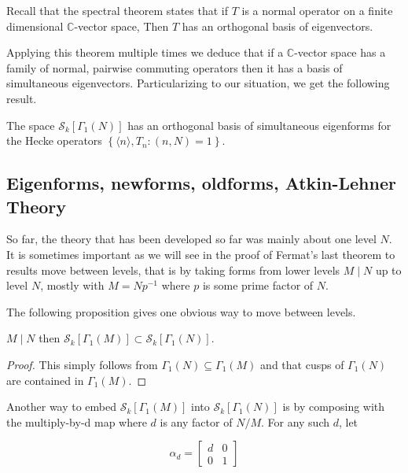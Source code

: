 Recall that the spectral theorem states that if $T$ is a normal operator on a finite dimensional $\mathbb{C}$-vector space, Then $T$ has an orthogonal basis of eigenvectors.

Applying this theorem multiple times we deduce that if a $\mathbb{C}$-vector space has a family of normal, pairwise commuting operators then it has a basis of simultaneous eigenvectors. Particularizing to our situation, we get the following result.
\begin{theorem}
    The space $\mathcal{S}_{k}\left[\Gamma_{1}(N)\right]$ has an orthogonal basis of simultaneous eigenforms for the Hecke operators $\left\{\langle n\rangle, T_{n}:(n, N)=1\right\}$.

\end{theorem}

\subsection{Eigenforms, newforms, oldforms, Atkin-Lehner Theory}

So far, the theory that has been developed so far was mainly about one level $N$. It is sometimes important as we will see in the proof of Fermat's last theorem to results move between levels, that is by taking forms from lower levels $M \mid N$ up to level $N$, mostly with $M=N p^{-1}$ where $p$ is some prime factor of $N$.

The following proposition gives one obvious way to move between levels.

\begin{proposition}
    $M \mid N$ then $\mathcal{S}_{k}\left[\Gamma_{1}(M)\right] \subset \mathcal{S}_{k}\left[\Gamma_{1}(N)\right]$.
    \begin{proof}
        This simply follows from $\Gamma_1(N) \subseteq \Gamma_1(M)$ and that cusps of $\Gamma_1(N)$ are contained in $\Gamma_1(M).$ 
    \end{proof}
\end{proposition}

Another way to embed $\mathcal{S}_{k}\left[\Gamma_{1}(M)\right]$ into $\mathcal{S}_{k}\left[\Gamma_{1}(N)\right]$ is by composing with the multiply-by-d map where $d$ is any factor of $N / M$. For any such $d$, let

$$
\alpha_{d}=\left[\begin{array}{ll}
d & 0 \\
0 & 1
\end{array}\right]
$$

